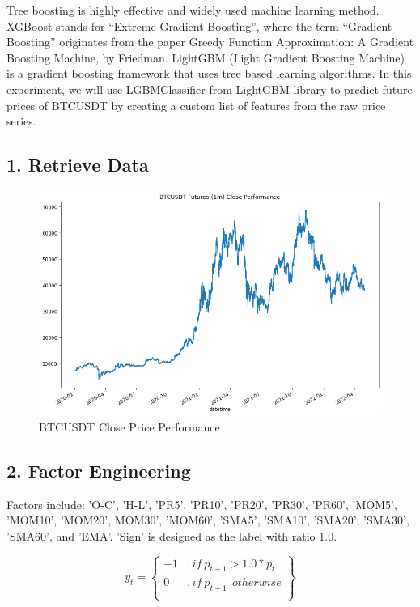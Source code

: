 \documentclass[UTF8]{ctexart}
\begin{document}
Tree boosting is highly effective and widely used machine learning method. XGBoost stands for “Extreme Gradient Boosting”, where the term “Gradient Boosting” originates from the paper Greedy Function Approximation: A Gradient Boosting Machine, by Friedman. LightGBM (Light Gradient Boosting Machine) is a gradient boosting framework that uses tree based learning algorithms. In this experiment, we will use LGBMClassifier from LightGBM library to predict future prices of BTCUSDT by creating a custom list of features from the raw price series.

\subsection*{1. Retrieve Data}

\begin{figure}[H]
	\centerline{\includegraphics[width=1\textwidth]{Q3_Close_Performance.png}}
	\caption{BTCUSDT Close Price Performance}
\end{figure}

\subsection*{2. Factor Engineering}

Factors include: 'O-C', 'H-L', 'PR5', 'PR10', 'PR20', 'PR30', 'PR60', 'MOM5', 'MOM10', 'MOM20', MOM30', 'MOM60', 'SMA5', 'SMA10', 'SMA20', 'SMA30', 'SMA60', and 'EMA'. 'Sign' is designed as the label with ratio 1.0.

\begin{equation}
	y_t= \left\{
	\begin{aligned}
		+1 & , if\ p_{t+1} > 1.0 * p_t  \\
		0  & , if\ p_{t+1}\ \ otherwise \\
	\end{aligned}
	\right\}
\end{equation}
\end{document}
